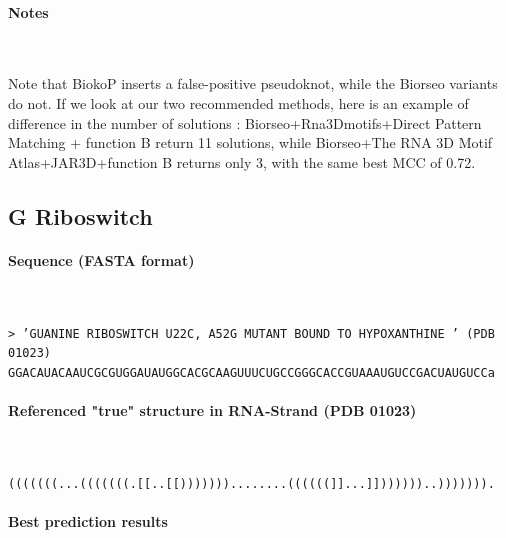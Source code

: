 \documentclass{article}
\begin{document}
\paragraph{Notes} ~

Note that BiokoP inserts a false-positive pseudoknot, while the Biorseo variants do not. If we look at our two recommended methods, here is an example of difference in the number of solutions : Biorseo+Rna3Dmotifs+Direct Pattern Matching + function B return 11 solutions, while Biorseo+The RNA 3D Motif Atlas+JAR3D+function B returns only 3, with the same best MCC of 0.72.

\subsection{G Riboswitch}

\paragraph{Sequence (FASTA format)} ~ 

\texttt{>  'GUANINE RIBOSWITCH U22C, A52G MUTANT BOUND TO HYPOXANTHINE ' (PDB 01023)\\
GGACAUACAAUCGCGUGGAUAUGGCACGCAAGUUUCUGCCGGGCACCGUAAAUGUCCGACUAUGUCCa}

\paragraph{Referenced "true" structure in RNA-Strand (PDB 01023)} ~ 

\texttt{(((((((...(((((((.[[..[[)))))))........((((((]]...]]))))))..))))))).}

\paragraph{Best prediction results} ~ 
\end{document}

